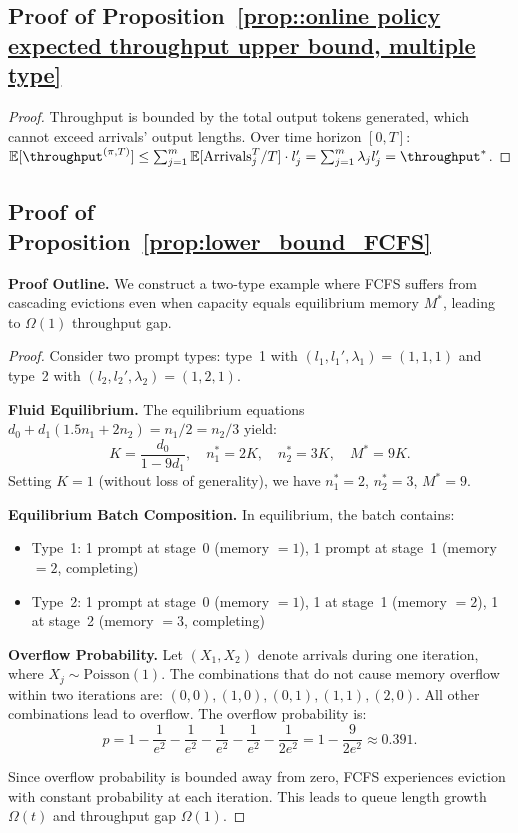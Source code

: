 \subsection{Proof of Proposition~\ref{prop::online policy expected throughput upper bound, multiple type}}
\label{appendix:proof_throughput_upper_bound}

\begin{proof}
Throughput is bounded by the total output tokens generated, which cannot exceed arrivals' output lengths. Over time horizon $[0,T]$: $\mathbb{E}[\throughput^{(\pi,T)}] \leq \sum_{j=1}^m \mathbb{E}[\text{Arrivals}_j^T/T] \cdot l_j' = \sum_{j=1}^m \lambda_j l_j' = \throughput^*$.
\end{proof}

\subsection{Proof of Proposition~\ref{prop:lower_bound_FCFS}}
\label{appendix:proof_fcfs_lower_bound}

\noindent\textbf{Proof Outline.} We construct a two-type example where FCFS suffers from cascading evictions even when capacity equals equilibrium memory $M^*$, leading to $\Omega(1)$ throughput gap.

\begin{proof}
Consider two prompt types: type~1 with $(l_1, l_1', \lambda_1) = (1, 1, 1)$ and type~2 with $(l_2, l_2', \lambda_2) = (1, 2, 1)$.

\textbf{Fluid Equilibrium.} The equilibrium equations $d_0 + d_1(1.5n_1 + 2n_2) = n_1/2 = n_2/3$ yield:
$$K = \frac{d_0}{1-9d_1}, \quad n_1^* = 2K, \quad n_2^* = 3K, \quad M^* = 9K.$$
Setting $K = 1$ (without loss of generality), we have $n_1^* = 2$, $n_2^* = 3$, $M^* = 9$.

\textbf{Equilibrium Batch Composition.} In equilibrium, the batch contains:
\begin{itemize}
\item Type~1: 1 prompt at stage~0 (memory $= 1$), 1 prompt at stage~1 (memory $= 2$, completing)
\item Type~2: 1 prompt at stage~0 (memory $= 1$), 1 at stage~1 (memory $= 2$), 1 at stage~2 (memory $= 3$, completing)
\end{itemize}

\textbf{Overflow Probability.} Let $(X_1, X_2)$ denote arrivals during one iteration, where $X_j \sim \text{Poisson}(1)$. The combinations that do not cause memory overflow within two iterations are: $(0,0), (1,0), (0,1), (1,1), (2,0)$. All other combinations lead to overflow. The overflow probability is:
$$p = 1 - \frac{1}{e^2} - \frac{1}{e^2} - \frac{1}{e^2} - \frac{1}{e^2} - \frac{1}{2e^2} = 1 - \frac{9}{2e^2} \approx 0.391.$$

Since overflow probability is bounded away from zero, FCFS experiences eviction with constant probability at each iteration. This leads to queue length growth $\Omega(t)$ and throughput gap $\Omega(1)$.
\end{proof}

